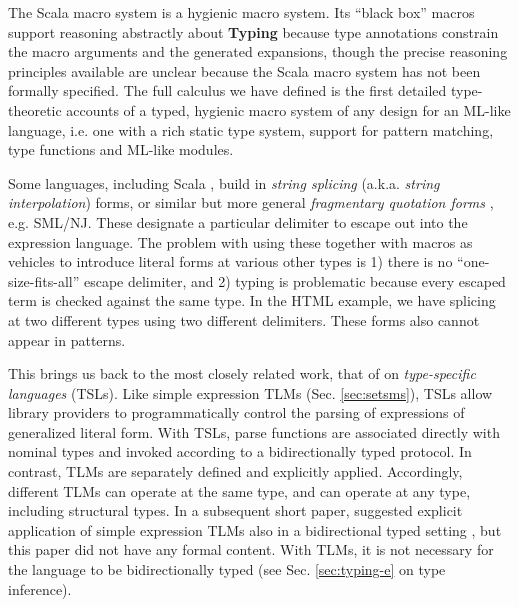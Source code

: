 \documentclass[acmsmall,review,anonymous]{acmart}\settopmatter{printfolios=true,printccs=false,printacmref=false}
\begin{document}
The Scala macro system is a hygienic macro system. Its ``black box'' macros support reasoning abstractly about \textbf{Typing} because type annotations constrain the macro arguments and the generated expansions, though the precise reasoning principles available are unclear because the Scala macro system has not been formally specified. The full calculus we have defined is the first detailed type-theoretic accounts of a typed, hygienic macro system of any design for an ML-like language, i.e. one with a rich static type system, support for pattern matching, type functions and ML-like modules.

  Some languages, including Scala \cite{odersky2008programming}, build in \emph{string splicing} (a.k.a. \emph{string interpolation}) forms, or similar but more general \emph{fragmentary quotation forms} \cite{conf/icfp/Slind91}, e.g. SML/NJ. These designate a particular delimiter to escape out into the expression language. The problem with using these together with macros as vehicles to introduce literal forms at various other types is 1) there is no ``one-size-fits-all'' escape delimiter, and 2) typing is problematic because every escaped term is checked against the same type. In the HTML example, we have splicing at two different types using two different delimiters. These forms also cannot appear in patterns.%


This brings us back to the most closely related work, that of \citet{TSLs} on \emph{type-specific languages} (TSLs). Like simple expression TLMs (Sec. \ref{sec:setsms}), TSLs allow library providers to programmatically control the parsing of expressions of generalized literal form. With TSLs, parse functions are associated directly with nominal types and invoked according to a bidirectionally typed protocol. In contrast, TLMs are separately defined and explicitly applied. Accordingly, different TLMs can operate at the same type, and can operate at any type, including structural types.  In a subsequent short paper, \citet{sac15} suggested explicit application of simple expression TLMs  also in a bidirectional typed setting \cite{Pierce:2000:LTI:345099.345100}, but this paper did not have any formal content. With TLMs, it is not necessary for the language to be bidirectionally typed (see Sec. \ref{sec:typing-e} on type inference).%
\end{document}
